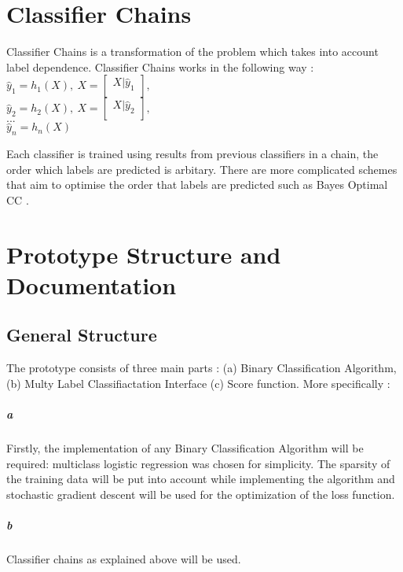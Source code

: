 \documentclass[10pt,letterpaper]{article}
\begin{document}
	\section*{Classifier Chains}
	Classifier Chains is a transformation of the problem which takes into account label dependence. Classifier Chains works in the following way \cite{MLC_finland}:\\ %
	$ 
	\hat{y}_{1} = h_{1}(X) ,  	\ 
	X = 	
	\begin{bmatrix}
		X	| \hat{y}_{1} \\
	\end{bmatrix}
	,$\\
	
	$ \hat{y}_{2} = h_{2}(X) ,  	\ 
	X = 	
	\begin{bmatrix}
	X	| \hat{y}_{2} \\
	\end{bmatrix} 
	,$
	\\
	$  	
	...  
	$
	\\
	$\hat{y}_{n} = h_{n}(X) $
	\newline
	
	Each classifier is trained using results from previous classifiers in a chain, the order which labels are predicted is %
	arbitary. There are more complicated schemes that aim to optimise the order that labels are predicted such as Bayes Optimal CC \cite{MLC_finland}.
	
	\section*{Prototype Structure and Documentation}
	\subsection*{General Structure}
	The prototype consists of three main parts : (a) Binary Classification Algorithm, (b) Multy Label Classifiactation Interface (c) Score function.  More specifically :

	\subparagraph{a}Firstly, the implementation of any Binary Classification Algorithm will be required: multiclass logistic regression was chosen for simplicity. 
	The sparsity of the training data will be put into account while implementing the algorithm and stochastic gradient descent will be used for the optimization of the loss function.
	
	\subparagraph{b}Classifier chains as explained above will be used.
	
\end{document}
